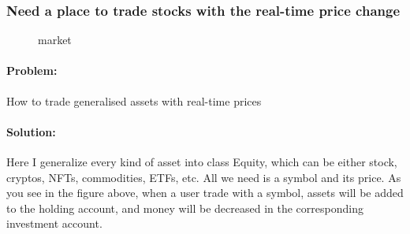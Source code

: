 \documentclass[a4paper,12pt]{report}
\begin{document}
\subsubsection*{Need a place to trade stocks with the real-time price change}
	\begin{figure}[H]
	\centering{}
	\caption{market}
	\label{img:market}
	\end{figure}

	\paragraph{Problem:} How to trade generalised assets with real-time prices

	\paragraph*{Solution:} Here I generalize every kind of asset into class Equity, which can be either stock, cryptos, NFTs, commodities, ETFs, etc. All we need is a symbol and its price. As you see in the figure above, when a user trade with a symbol, assets will be added to the holding account, and money will be decreased in the corresponding investment account.
\end{document}

